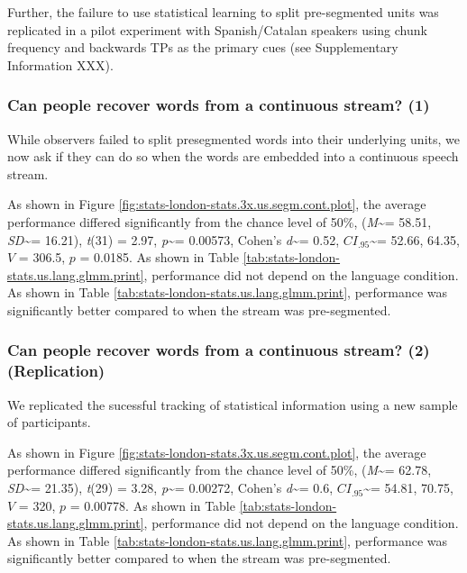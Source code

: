 \documentclass[]{article}
\newcommand{\T}{{\em t\/}}
\newcommand{\p}{{\em p\/}}
\newcommand{\M}{{\em M\/}}
\newcommand{\SD}{{\em SD\/}}
\newcommand{\D}{Cohen's {\em d\/}}
\newcommand{\CI}{$CI_{.95}$}
\begin{document}
Further, the failure to use statistical learning to split pre-segmented
units was replicated in a pilot experiment with Spanish/Catalan speakers
using chunk frequency and backwards TPs as the primary cues (see
Supplementary Information XXX).

\subsubsection{Can people recover words from a continuous stream?
(1)}\label{can-people-recover-words-from-a-continuous-stream-1}

While observers failed to split presegmented words into their underlying
units, we now ask if they can do so when the words are embedded into a
continuous speech stream.

As shown in Figure \ref{fig:stats-london-stats.3x.us.segm.cont.plot},
the average performance differed significantly from the chance level of
50\%, (\M\textasciitilde{}= 58.51, \SD\textasciitilde{}= 16.21), \T(31)
= 2.97, \p\textasciitilde{}= 0.00573, \D\textasciitilde{}= 0.52,
\CI\textasciitilde{}= 52.66, 64.35, \(V\) = 306.5, \(p\) = 0.0185. As
shown in Table \ref{tab:stats-london-stats.us.lang.glmm.print},
performance did not depend on the language condition. As shown in Table
\ref{tab:stats-london-stats.us.lang.glmm.print}, performance was
significantly better compared to when the stream was pre-segmented.

\subsubsection{Can people recover words from a continuous stream? (2)
(Replication)}\label{can-people-recover-words-from-a-continuous-stream-2-replication}

We replicated the sucessful tracking of statistical information using a
new sample of participants.

As shown in Figure \ref{fig:stats-london-stats.3x.us.segm.cont.plot},
the average performance differed significantly from the chance level of
50\%, (\M\textasciitilde{}= 62.78, \SD\textasciitilde{}= 21.35), \T(29)
= 3.28, \p\textasciitilde{}= 0.00272, \D\textasciitilde{}= 0.6,
\CI\textasciitilde{}= 54.81, 70.75, \(V\) = 320, \(p\) = 0.00778. As
shown in Table \ref{tab:stats-london-stats.us.lang.glmm.print},
performance did not depend on the language condition. As shown in Table
\ref{tab:stats-london-stats.us.lang.glmm.print}, performance was
significantly better compared to when the stream was pre-segmented.
\end{document}

